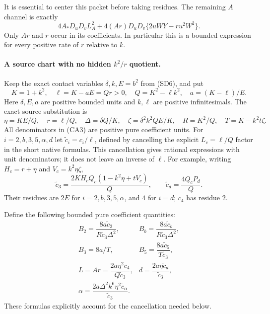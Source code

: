 It is essential to center this packet before taking residues.
The remaining $A$ channel is exactly
\[
 4A_*D_uD_vL_A^2+
 4(Ar)D_uD_v\{2uWY-r u^2W^2\}.                         \tag{CA2}
\]
Only $Ar$ and $r$ occur in its coefficients. In particular this is a
bounded expression for every positive rate of $r$ relative to $k$.

\paragraph{A source chart with no hidden $k^2/r$ quotient.}
Keep the exact contact variables $\delta,k,E=b^2$ from (SD6), and put
\[
 K=1+k^2,\quad \ell=K-aE=Qr>0,\quad
 Q=K^2-\ell k^2,\quad a=(K-\ell)/E.
\]
Here $\delta,E,a$ are positive bounded units and $k,\ell$ are positive
infinitesimals. The exact source substitution is
\[
 \eta=KE/Q,\quad r=\ell/Q,\quad
 \Delta=\delta Q/K,\quad \zeta=\delta^2k^2QE/K,
 \quad R=K^2/Q,\quad T=K-k^2t\zeta.                    \tag{CA3}
\]
All denominators in (CA3) are positive pure coefficient units.
For $i=2,b,3,5,\alpha,d$ let $\widetilde c_i=c_i/\ell$,
defined by cancelling the explicit $L_c=\ell/Q$ factor in the short
native formulas. This cancellation gives rational expressions with
unit denominators; it does not leave an inverse of $\ell$.
For example, writing $H_c=r+\eta$ and $V_c=k^2\eta\zeta$,
\[
 \widetilde c_3=\frac{2KH_cQ_c(1-k^2\eta+tV_c)}Q,
 \qquad \widetilde c_d=\frac{4Q_cP_d}Q.
\]
Their residues are $2E$ for $i=2,b,3,5,\alpha$, and $4$ for $i=d$;
$c_4$ has residue $2$.

Define the following bounded pure coefficient quantities:
\[
 \begin{array}{ll}
 B_2=\dfrac{8a\widetilde c_2}{R\widetilde c_3\Delta^2},&
 B_b=\dfrac{8a\widetilde c_b}{R\widetilde c_3\Delta^2},\\[4pt]
 B_3=8a/T,&B_5=\dfrac{8a\widetilde c_5}{T\widetilde c_3},\\[4pt]
 L=Ar=\dfrac{2a\eta^2c_4}{Q\widetilde c_3},&
 d=\dfrac{2a\eta\widetilde c_d}{\widetilde c_3},\\[4pt]
 \alpha=\dfrac{2a\Delta^2k^6\eta^2\widetilde c_\alpha}
                    {\widetilde c_3}.&
 \end{array}                                                     \tag{CA4}
\]
These formulas explicitly account for the cancellation needed below.

